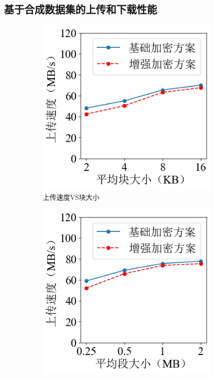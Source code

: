\documentclass[promaster]{thesis-uestc}
\begin{document}
\subsection{基于合成数据集的上传和下载性能}\label{基于合成数据集的上传和下载性能}
\begin{figure}[h]
    \centering
    \begin{subfigure}{0.40\textwidth}
        \includegraphics[width=1\linewidth]{pic/upload_chunk_size.png}
        \centering
        \captionsetup{width=\textwidth}
        \caption{上传速度VS块大小}
        \label{上传下载速度1}
    \end{subfigure}
    \begin{subfigure}{0.40\textwidth}
        \includegraphics[width=1\linewidth]{pic/upload_segment_size.png}

\end{subfigure}
\end{figure}
\end{document}
